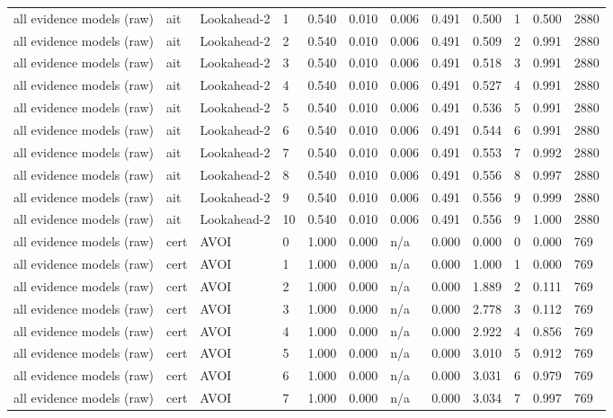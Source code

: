 \begin{table}[!ht]
{\begin{tabular}{llllllllllll}
all evidence models (raw) & ait & Lookahead-2 & 1 & 0.540 & 0.010 & 0.006 & 0.491 & 0.500 & 1 & 0.500 & 2880 \\
all evidence models (raw) & ait & Lookahead-2 & 2 & 0.540 & 0.010 & 0.006 & 0.491 & 0.509 & 2 & 0.991 & 2880 \\
all evidence models (raw) & ait & Lookahead-2 & 3 & 0.540 & 0.010 & 0.006 & 0.491 & 0.518 & 3 & 0.991 & 2880 \\
all evidence models (raw) & ait & Lookahead-2 & 4 & 0.540 & 0.010 & 0.006 & 0.491 & 0.527 & 4 & 0.991 & 2880 \\
all evidence models (raw) & ait & Lookahead-2 & 5 & 0.540 & 0.010 & 0.006 & 0.491 & 0.536 & 5 & 0.991 & 2880 \\
all evidence models (raw) & ait & Lookahead-2 & 6 & 0.540 & 0.010 & 0.006 & 0.491 & 0.544 & 6 & 0.991 & 2880 \\
all evidence models (raw) & ait & Lookahead-2 & 7 & 0.540 & 0.010 & 0.006 & 0.491 & 0.553 & 7 & 0.992 & 2880 \\
all evidence models (raw) & ait & Lookahead-2 & 8 & 0.540 & 0.010 & 0.006 & 0.491 & 0.556 & 8 & 0.997 & 2880 \\
all evidence models (raw) & ait & Lookahead-2 & 9 & 0.540 & 0.010 & 0.006 & 0.491 & 0.556 & 9 & 0.999 & 2880 \\
all evidence models (raw) & ait & Lookahead-2 & 10 & 0.540 & 0.010 & 0.006 & 0.491 & 0.556 & 9 & 1.000 & 2880 \\
all evidence models (raw) & cert & AVOI & 0 & 1.000 & 0.000 & n/a & 0.000 & 0.000 & 0 & 0.000 & 769 \\
all evidence models (raw) & cert & AVOI & 1 & 1.000 & 0.000 & n/a & 0.000 & 1.000 & 1 & 0.000 & 769 \\
all evidence models (raw) & cert & AVOI & 2 & 1.000 & 0.000 & n/a & 0.000 & 1.889 & 2 & 0.111 & 769 \\
all evidence models (raw) & cert & AVOI & 3 & 1.000 & 0.000 & n/a & 0.000 & 2.778 & 3 & 0.112 & 769 \\
all evidence models (raw) & cert & AVOI & 4 & 1.000 & 0.000 & n/a & 0.000 & 2.922 & 4 & 0.856 & 769 \\
all evidence models (raw) & cert & AVOI & 5 & 1.000 & 0.000 & n/a & 0.000 & 3.010 & 5 & 0.912 & 769 \\
all evidence models (raw) & cert & AVOI & 6 & 1.000 & 0.000 & n/a & 0.000 & 3.031 & 6 & 0.979 & 769 \\
all evidence models (raw) & cert & AVOI & 7 & 1.000 & 0.000 & n/a & 0.000 & 3.034 & 7 & 0.997 & 769 \\

\end{tabular}}
\end{table}
